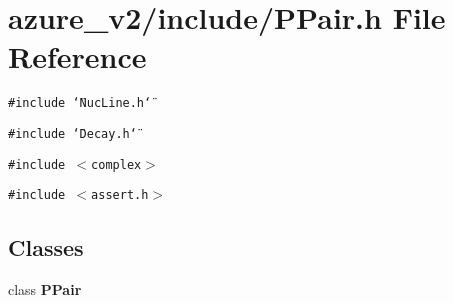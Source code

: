 \section{azure\_\-v2/include/PPair.h File Reference}
\label{PPair_8h}
{\tt \#include \char`\"{}Nuc\-Line.h\char`\"{}}\par
{\tt \#include \char`\"{}Decay.h\char`\"{}}\par
{\tt \#include $<$complex$>$}\par
{\tt \#include $<$assert.h$>$}\par
\subsection*{Classes}
\begin{CompactItemize}
\item 
class \bf{PPair}
\end{CompactItemize}
